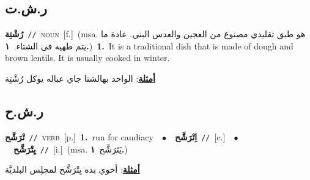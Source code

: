 \documentclass[10pt,a4paper,twoside]{article} %
\begin{document}
\begin{multicols}{2}
\vspace{-3mm}
\subsection*{\color{blue}\foreignlanguage{arabic}{ر.ش.ت}\color{blue}{ (ntws)}} 

{\setlength\topsep{0pt}\textbf{\foreignlanguage{arabic}{رُشْتِة}}\ {\color{gray}\texttt{//}\color{black}}\ \textsc{noun}\ [f.]\ \color{gray}(msa. \foreignlanguage{arabic}{هو طبق تقليدي مصنوع من العجين والعدس البني. عادة ما يتم طهيه في الشتاء.}~\foreignlanguage{arabic}{\textbf{١.}})\color{black}\ \textbf{1.}~It is a traditional dish that is made of dough and brown lentils. It is usually cooked in winter.\  \begin{flushright}\color{gray}\foreignlanguage{arabic}{\textbf{\underline{\foreignlanguage{arabic}{أمثلة}}}: الواحد بهالشتا جاي عباله يوكل رُشْتِة}\end{flushright}\color{black}} \vspace{2mm}

\vspace{-3mm}
\subsection*{\color{blue}\foreignlanguage{arabic}{ر.ش.ح}\color{blue}{}} 

{\setlength\topsep{0pt}\textbf{\foreignlanguage{arabic}{تْرَشَّح}}\ {\color{gray}\texttt{//}\color{black}}\ \textsc{verb}\ [p.]\ \textbf{1.}~run for candiacy\ \ $\bullet$\ \ \setlength\topsep{0pt}\textbf{\foreignlanguage{arabic}{اِتْرَشَّح}}\ {\color{gray}\texttt{//}\color{black}}\ [c.]\ \ $\bullet$\ \ \setlength\topsep{0pt}\textbf{\foreignlanguage{arabic}{يِتْرَشَّح}}\ {\color{gray}\texttt{//}\color{black}}\ [i.]\ \color{gray}(msa. \foreignlanguage{arabic}{يَتَرَشَّح}~\foreignlanguage{arabic}{\textbf{١.}})\color{black}\  \begin{flushright}\color{gray}\foreignlanguage{arabic}{\textbf{\underline{\foreignlanguage{arabic}{أمثلة}}}: أخوي بده يِتْرَشَّح لمجلِس البلديَّة}\end{flushright}\color{black}} \vspace{2mm}


\end{multicols}
\end{document}
